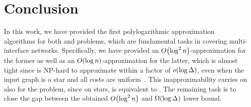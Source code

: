 \section{Conclusion} \label{sec:conclusion}

In this work, we have provided the first polylogarithmic approximation algorithms for both \connectivity and \coverage problems, which are fundamental tasks in covering multi-interface networks. Specifically, we have provided an $O\mathopen{}\left( \log^2 n \right)$-approximation for the former as well as an $O\mathopen{}\left( \log n \right)$-approximation for the latter, which is almost tight since \coverage is NP-hard to approximate within a factor of $o\mathopen{}\left( \log \Delta \right)$, even when the input graph is a star and all costs are uniform~\cite{MinimizeTheMaximumDutyInMultiInterfaceNetworks}. This inapproximability carries on also for the \connectivity problem, since on stars, \connectivity is equivalent to \coverage. The remaining task is to close the gap between the obtained $O\mathopen{}\left( \log^2 n \right)$ and $\Omega\mathopen{}\left( \log \Delta \right)$ lower bound.

